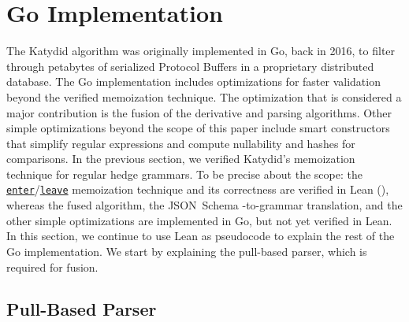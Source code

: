 \documentclass[acmsmall,%
  screen,%
  authorversion, %
  nonacm%
]{acmart}
\newcommand{\link}[2]{\mbox{\hyperref[#2]{\lstinline{#1}}}\xspace}
\newcommand{\enter}{\link{enter}{def enter}}
\newcommand{\leave}{\link{leave}{def leave}}
\newcommand{\JSONSchema}{%
  JSON~Schema\xspace%
}
\begin{document}
\section{Go Implementation}
\label{section_go}

The Katydid algorithm was originally implemented in Go, back in 2016, to filter through petabytes of serialized Protocol Buffers in a proprietary distributed database.
The Go implementation includes optimizations for faster validation beyond the verified memoization technique.
The optimization that is considered a major contribution is the fusion of the derivative and parsing algorithms.
Other simple optimizations beyond the scope of this paper include smart constructors that simplify regular expressions and compute nullability and hashes for comparisons.
In the previous section, we verified Katydid's memoization technique for regular hedge grammars.
To be precise about the scope: the \enter/\leave memoization technique and its correctness are verified in Lean (), whereas the fused algorithm, the \JSONSchema-to-grammar translation, and the other simple optimizations are implemented in Go, but not yet verified in Lean.
In this section, we continue to use Lean as pseudocode to explain the rest of the Go implementation.
We start by explaining the pull-based parser, which is required for fusion.

\subsection{Pull-Based Parser}
\end{document}
